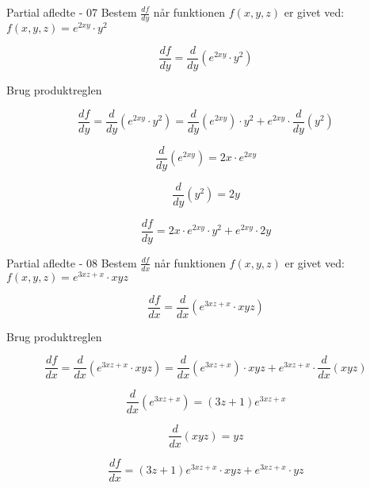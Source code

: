 \documentclass{article}
\begin{document}
\begin{exercise}{Partial afledte - 07}
	Bestem $\frac{df}{dy}$ når funktionen $f(x,y,z)$ er givet ved:
	$f(x,y,z) = e^{2xy} \cdot y^2$ 
	
	
	\hint
	\[
	\frac{df}{dy} = \frac{d}{dy} \left(e^{2xy} \cdot y^2\right) 
	\]
	
	\hint
	Brug produktreglen
	
	\hint
	\[
	\frac{df}{dy} = \frac{d}{dy} \left( e^{2xy} \cdot y^2\right) = \frac{d}{dy} \left( e^{2xy} \right) \cdot y^2 + e^{2xy} \cdot \frac{d}{dy}\left( y^2\right)
	\]
	
	\hint
	\[
	\frac{d}{dy} \left(e^{2xy} \right) = 2x \cdot e^{2xy}
	\]
	
	\hint
	\[
	\frac{d}{dy}\left( y^2\right) = 2y
	\]
	
	\hint
	\[
	\frac{df}{dy}  = 2x \cdot e^{2xy} \cdot y^2 + e^{2xy} \cdot 2y
	\]
	
	
\end{exercise}

\begin{exercise}{Partial afledte - 08}
	Bestem $\frac{df}{dx}$ når funktionen $f(x,y,z)$ er givet ved:
	$f(x,y,z) = e^{3xz+x} \cdot xyz$ 
	
	
	\hint
	\[
	\frac{df}{dx} = \frac{d}{dx} \left( e^{3xz+x} \cdot xyz\right) 
	\]
	
	\hint
	Brug produktreglen
	
	\hint
	\[
	\frac{df}{dx} = \frac{d}{dx} \left( e^{3xz+x} \cdot xyz\right) = \frac{d}{dx} \left(e^{3xz+x} \right) \cdot xyz + e^{3xz+x} \cdot \frac{d}{dx}\left( xyz\right)
	\]
	
	\hint
	\[
	\frac{d}{dx} \left( e^{3xz+x}\right) = (3z+1) e^{3xz+x}
	\]
	
	\hint
	\[
	\frac{d}{dx}\left( xyz\right) = yz
	\]
	
	\hint
	\[
	\frac{df}{dx}  = (3z+1) e^{3xz+x} \cdot xyz + e^{3xz+x} \cdot yz
	\]
	
	
\end{exercise}
\end{document}
